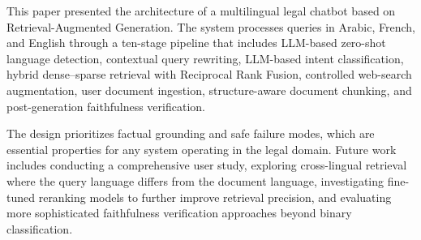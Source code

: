 \documentclass[12pt, a4paper]{article}
\begin{document}
This paper presented the architecture of a multilingual legal chatbot based on
Retrieval-Augmented Generation. The system processes queries in Arabic, French,
and English through a ten-stage pipeline that includes LLM-based zero-shot
language detection, contextual query rewriting, LLM-based intent classification,
hybrid dense--sparse retrieval with Reciprocal Rank Fusion, controlled web-search
augmentation, user document ingestion, structure-aware document chunking, and
post-generation faithfulness verification.

The design prioritizes factual grounding and safe failure modes, which are
essential properties for any system operating in the legal domain. Future work
includes conducting a comprehensive user study, exploring cross-lingual retrieval
where the query language differs from the document language, investigating
fine-tuned reranking models to further improve retrieval precision, and
evaluating more sophisticated faithfulness verification approaches beyond
binary classification.
\end{document}
